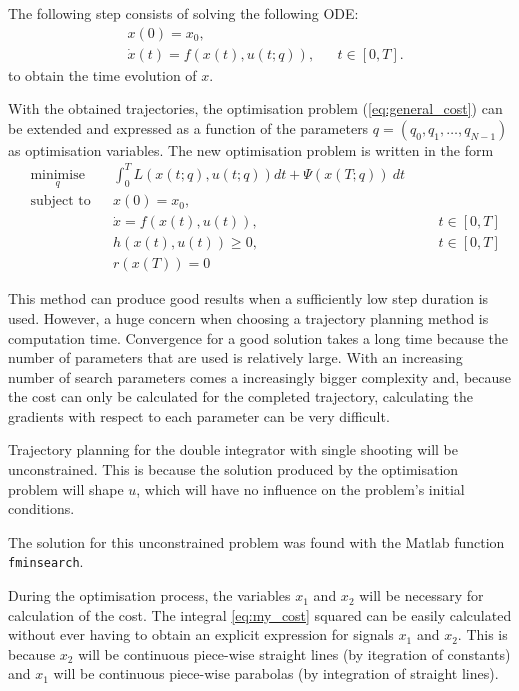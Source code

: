 \par The following step consists of solving the following ODE:
\begin{equation}
    \label{eq:ode_zoh}
    \begin{aligned}
        & x(0) = x_0, \\
        & \dot{x}(t) = f(x(t),u(t;q)), && t\in[0,T].
    \end{aligned}
\end{equation}
to obtain the time evolution of $x$.

\par With the obtained trajectories, the optimisation problem (\ref{eq:general_cost}) can be extended and expressed as a function of the parameters $q=(q_0,q_1,\dots,q_{N-1})$ as optimisation variables. The new optimisation problem is written in the form  
\begin{equation}
    \begin{aligned}
    & \underset{q}{\text{minimise}} && \int_0^T L(x(t;q),u(t;q))dt + \Psi (x(T;q)) \ dt \\
    & \text{subject to}  && x(0) = x_0, \\
        & && \dot{x} = f(x(t), u(t)), &&& t \in [0,T]  \\
        & && h(x(t),u(t)) \geq 0, &&&  t \in [0,T]  \\
        & && r(x(T)) = 0
    \end{aligned}
    \label{eq:cost_zoh}
\end{equation}

\par This method can produce good results when a sufficiently low step duration is used. However, a huge concern when choosing a trajectory planning method is computation time. Convergence for a good solution takes a long time because the number of parameters that are used is relatively large. With an increasing number of search parameters comes a increasingly bigger complexity and, because the cost can only be calculated for the completed trajectory, calculating the gradients with respect to each parameter can be very difficult.

\par Trajectory planning for the double integrator with single shooting will be unconstrained. This is because the solution produced by the optimisation problem will shape $u$, which will have no influence on the problem's initial conditions. 
\par The solution for this unconstrained problem was found with the Matlab function \texttt{fminsearch}.
\par During the optimisation process, the variables $x_1$ and $x_2$ will be necessary for calculation of the cost. The integral \ref{eq:my_cost} squared  can be easily calculated without ever having to obtain an explicit expression for signals $x_1$ and $x_2$. This is because $x_2$ will be continuous piece-wise straight lines (by itegration of constants) and $x_1$ will be continuous piece-wise parabolas (by integration of straight lines).

